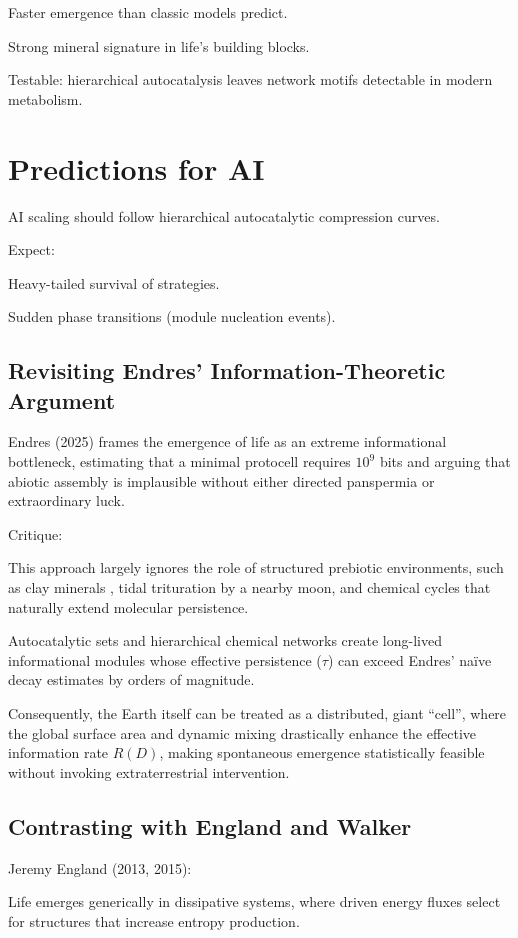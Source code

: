 \documentclass{book}
\begin{document}
Faster emergence than classic models predict.

Strong mineral signature in life’s building blocks.

Testable: hierarchical autocatalysis leaves network motifs detectable in modern metabolism.

\chapter{Predictions for AI}
AI scaling should follow hierarchical autocatalytic compression curves.

Expect:

Heavy-tailed survival of strategies.

Sudden phase transitions (module nucleation events).

\section{Revisiting Endres’ Information-Theoretic Argument}
Endres (2025) frames the emergence of life as an extreme informational bottleneck, estimating that a minimal protocell requires $10^9$ bits and arguing that abiotic assembly is implausible without either directed panspermia or extraordinary luck.

Critique:

This approach largely ignores the role of structured prebiotic environments, such as clay minerals \citep{hazen2005}, tidal trituration by a nearby moon, and chemical cycles that naturally extend molecular persistence.

Autocatalytic sets and hierarchical chemical networks create long-lived informational modules whose effective persistence ($\tau$) can exceed Endres’ naïve decay estimates by orders of magnitude.

Consequently, the Earth itself can be treated as a distributed, giant “cell”, where the global surface area and dynamic mixing drastically enhance the effective information rate $R(D)$, making spontaneous emergence statistically feasible without invoking extraterrestrial intervention.

\section{Contrasting with England and Walker}
Jeremy England (2013, 2015):

Life emerges generically in dissipative systems, where driven energy fluxes select for structures that increase entropy production.
\end{document}
